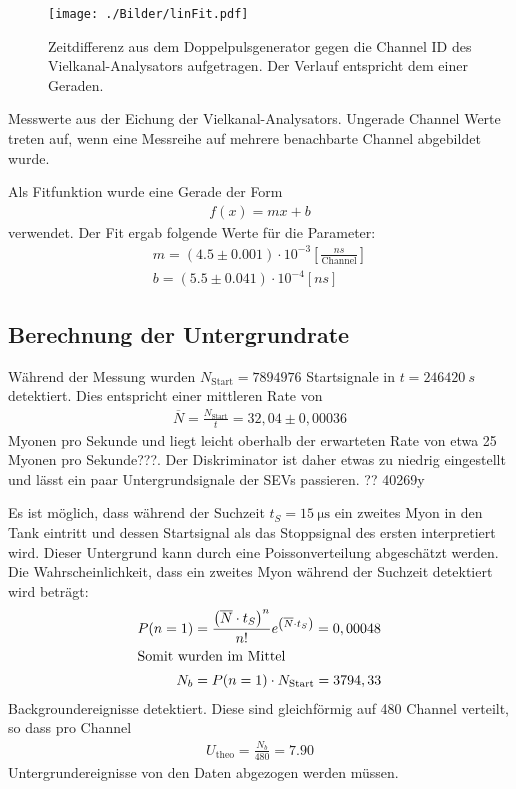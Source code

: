\begin{figure}[H]
	\texttt{[image: ./Bilder/linFit.pdf]}
	\caption{Zeitdifferenz aus dem Doppelpulsgenerator gegen die Channel ID des Vielkanal-Analysators aufgetragen. Der Verlauf entspricht dem einer Geraden.}
	\label{fig:linFit}
\end{figure}

\begin{table}[htbp]
	
	\caption{Messwerte aus der Eichung der Vielkanal-Analysators. Ungerade Channel Werte treten auf, wenn eine Messreihe auf mehrere benachbarte Channel abgebildet wurde.}
	\label{tab:linFit}
\end{table}


Als Fitfunktion wurde eine Gerade der Form
\begin{align}
	f(x) = mx + b
\end{align}
verwendet. Der Fit ergab folgende Werte für die Parameter:
\begin{align}
	m = (4.5 \pm 0.001) \cdot10^{-3} \left[\frac{\si{ns}}{\text{Channel}}\right]\\ 
	b = (5.5 \pm 0.041) \cdot 10^{-4} [\si{ns}]
\end{align}

\subsection{Berechnung der Untergrundrate}
Während der Messung  wurden $N_\text{Start} = 7894976$ Startsignale in $t = \SI{246420}{s}$ detektiert. Dies entspricht einer mittleren Rate von 
\begin{align}
	\overline{N} = \frac{N_\text{Start}}{t} = 32,04\pm 0,00036
\end{align}
Myonen pro Sekunde und liegt leicht oberhalb der erwarteten Rate von etwa 25 Myonen pro Sekunde???. Der Diskriminator ist daher etwas zu niedrig eingestellt und lässt ein paar Untergrundsignale der SEVs passieren. ?? 40269y
 
Es ist möglich, dass während der Suchzeit $t_S = \SI{15}{\micro\second}$ ein zweites Myon in den Tank eintritt und dessen Startsignal als das Stoppsignal des ersten interpretiert wird. Dieser Untergrund kann durch eine Poissonverteilung abgeschätzt werden. Die Wahrscheinlichkeit, dass ein zweites Myon während der Suchzeit detektiert wird beträgt:
\begin{align}
 	P(n=1) &= \frac{\left(\overline{N}\cdot t_S\right)^n}{n!}{e^{\left(\overline{N}\cdot t_S\right)}} = 0,00048\\
 	\intertext{Somit wurden im Mittel}
 	N_b &= P(n=1)\cdot N_\text{Start} = 3794,33 
\end{align}
Backgroundereignisse detektiert. Diese sind gleichförmig auf 480 Channel verteilt, so dass pro Channel 
\begin{align}
	U_\text{theo} = \frac{N_b}{480} = 7.90
\end{align}
Untergrundereignisse von den Daten abgezogen werden müssen.
 

